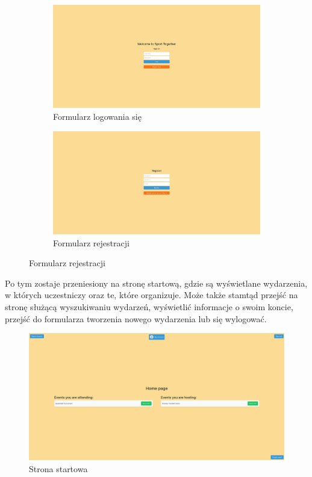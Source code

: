 \documentclass[11pt,a4paper]{article}
\begin{document}
\begin{figure}[H]
    \centering
    \captionsetup{justification=centering,margin=2cm}
        \begin{subfigure}{0.49\textwidth}
            \includegraphics[width=\textwidth]{pages/login_page.png}
            \caption{Formularz logowania się}
        \end{subfigure}
    \hfill
        \begin{subfigure}{0.49\textwidth}
            \includegraphics[width=\textwidth]{pages/register.png}
            \caption{Formularz rejestracji}
        \end{subfigure}
\end{figure}

Po tym zostaje przeniesiony na stronę startową, gdzie są wyświetlane wydarzenia, w których uczestniczy oraz te, które organizuje. Może także stamtąd przejść na stronę służącą wyszukiwaniu wydarzeń, wyświetlić informacje o swoim koncie, przejść do formularza tworzenia nowego wydarzenia lub się wylogować.

\begin{figure} [H]
    \centering
    \includegraphics[width=1\linewidth]{pages/home.png}
    \caption{Strona startowa}
\end{figure}
\end{document}
